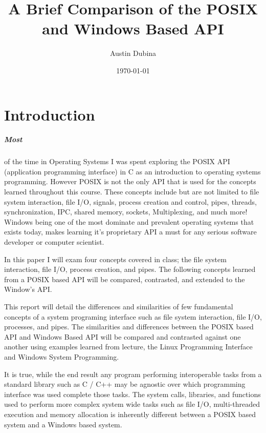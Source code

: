 \documentclass[11pt]{report}
\begin{document}
\title{\bf A Brief Comparison of the POSIX and Windows Based API}  %
\author{Austin Dubina}
\date{\today}
\maketitle
{}
\setcounter{page}{0}
\tableofcontents

\chapter{Introduction}

\paragraph{Most} of the time in Operating Systems I was spent exploring the POSIX API (application programming interface) in C as an introduction to operating systems programming. However POSIX is not the only API that is used for the concepts learned throughout this course. These concepts include but are not limited to file system interaction, file I/O, signals, process creation and control, pipes, threads, synchronization, IPC, shared memory, sockets, Multiplexing, and much more! Windows being one of the most dominate and prevalent operating systems that exists today, makes learning it’s proprietary API a must for any serious software developer or computer scientist. 

In this paper I will exam four concepts covered in class; the file system interaction, file I/O, process creation, and pipes. The following concepts learned from a POSIX based API will be compared, contrasted, and extended to the Window’s API. 

This report will detail the differences and similarities of few fundamental concepts of a system programing interface such as file system interaction, file I/O, processes, and pipes. The similarities and differences between the POSIX based API and Windows Based API will be compared and contrasted against one another using examples learned from lecture, the Linux Programming Interface and Windows System Programming. 

It is true, while the end result any program performing interoperable tasks from a standard library such as C / C++ may be agnostic over which programming interface was used complete those tasks. The system calls, libraries, and functions used to perform more complex system wide tasks such as file I/O, multi-threaded execution and memory allocation is inherently different between a POSIX based system and a Windows based system.
\end{document}
